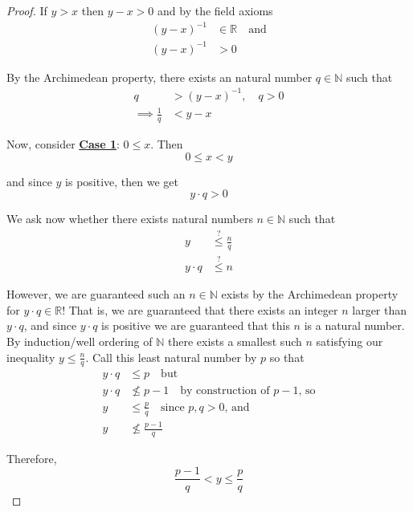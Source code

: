 \documentclass[12pt]{article}
\newlength\tindent
\renewcommand{\indent}{\hspace*{\tindent}}
\newcommand{\R}{\mathbb R}
\newcommand{\N}{\mathbb N}
\begin{document}
\begin{proof} If $y > x$ then $y - x > 0$ and by the field axioms
\begin{align*}
	(y - x)^{-1} &\in \R \quad \text{and} \\
	(y - x)^{-1} &> 0
\end{align*}

By the Archimedean property, there exists an natural number $q \in \N$ such that 
\begin{align*}
	q &> (y - x)^{-1}, \quad q > 0 \\
	\implies \frac{1}{q} &< y - x
\end{align*}

Now, consider \underline{\bf Case 1}: $0 \leq x$. Then
\begin{equation*}
	0 \leq x < y
\end{equation*}

and since $y$ is positive, then we get
\begin{equation*}
	y \cdot q > 0
\end{equation*}

We ask now whether there exists natural numbers $n \in \N$ such that
\begin{align*}
	y &\stackrel{?}{\leq} \frac{n}{q} \\
	y\cdot q &\stackrel{?}{\leq} n
\end{align*}

\indent However, we are guaranteed such an $n \in \N$ exists by the Archimedean property for $y\cdot q \in \R$! That is, we are guaranteed that there exists an integer $n$ larger than $y\cdot q$, and since $y \cdot q$ is positive we are guaranteed that this $n$ is a natural number. \\

\indent By induction/well ordering of $\N$ there exists a smallest such $n$ satisfying our inequality $y \leq \frac{n}{q}$. Call this least natural number by $p$ so that
\begin{align*}
	y\cdot q &\leq p \quad \text{but} \\
	y\cdot q &\nleq p - 1 \quad \text{by construction of $p - 1$, so} \\
	y &\leq \frac{p}{q} \quad \text{since $p, q > 0$, and} \\
	y &\nleq \frac{p - 1}{q}
\end{align*}

Therefore,
\begin{equation*}
	\frac{p - 1}{q} < y \leq \frac{p}{q}
\end{equation*}


\end{proof}
\end{document}
